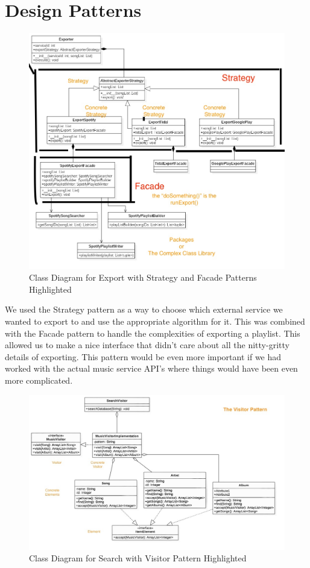 \documentclass[12pt]{article}
\begin{document}
	\section{Design Patterns}
	\begin{figure}[H]
		\centering
		\includegraphics[scale=0.25]{ExportClassDiagram.jpg}
		\caption{Class Diagram for Export with Strategy and Facade Patterns Highlighted}
		\label{fig:classDiagExportPattern}
	\end{figure}
	We used the Strategy pattern as a way to choose which external service we wanted to export to and use the appropriate algorithm for it. This was combined with the Facade pattern to handle the complexities of exporting a playlist. This allowed us to make a nice interface that didn't care about all the nitty-gritty details of exporting. This pattern would be even more important if we had worked with the actual music service API's where things would have been even more complicated. 
	\begin{figure}[H]
		\centering
		\includegraphics[scale=0.25]{Search.jpg}
		\caption{Class Diagram for Search with Visitor Pattern Highlighted}
		\label{fig:classDiagSearchPattern}
	\end{figure}
\end{document}
